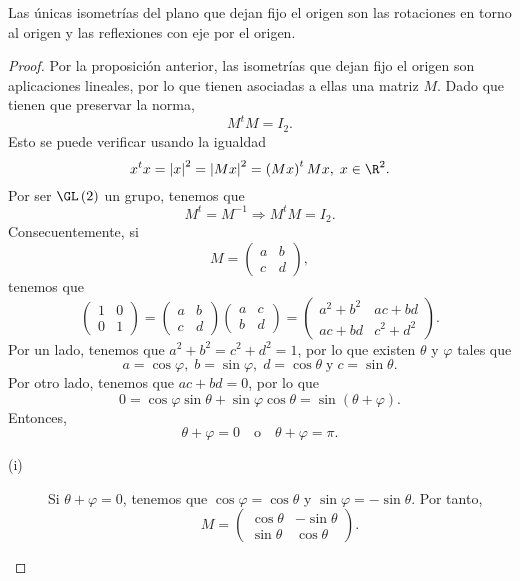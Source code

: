 \begin{fprop}[]
\normalfont Las únicas isometrías del plano que dejan fijo el origen son las rotaciones en torno al origen y las reflexiones con eje por el origen.
\end{fprop}

\begin{proof}
Por la proposición anterior, las isometrías que dejan fijo el origen son aplicaciones lineales, por lo que tienen asociadas a ellas una matriz $\displaystyle M $. Dado que tienen que preservar la norma, 
\[M^{t}M=I_{2} .\]
Esto se puede verificar usando la igualdad
\[x^{t}x = \left|x\right|^{2} = \left|Mx\right|^{2} = \left(Mx\right)^{t}Mx, \; x \in \R^{2} .\]
Por ser $\displaystyle \GL\left(2\right) $ un grupo, tenemos que 
\[M^{t} = M^{-1} \Rightarrow M^{t}M=I_{2} .\]
Consecuentemente, si 
\[M = \begin{pmatrix} a & b \\ c & d \end{pmatrix} ,\]
tenemos que 
\[\begin{pmatrix} 1 & 0 \\ 0 & 1 \end{pmatrix} = \begin{pmatrix} a & b \\ c & d \end{pmatrix}\begin{pmatrix} a & c \\ b & d \end{pmatrix} = \begin{pmatrix} a^{2}+b^{2} & ac+bd \\ ac + bd & c^{2}+d^{2} \end{pmatrix} .\]
Por un lado, tenemos que $\displaystyle a^{2}+b^{2} = c^{2}+d^{2} = 1 $, por lo que existen $\displaystyle \theta $ y $\displaystyle \varphi $ tales que 
\[a = \cos\varphi, \; b=\sin\varphi, \; d=\cos\theta \; \text{y} \; c = \sin \theta .\]
Por otro lado, tenemos que $\displaystyle ac+bd=0 $, por lo que
\[0 = \cos\varphi\sin\theta + \sin\varphi \cos\theta = \sin\left(\theta+\varphi\right) .\]
Entonces,
\[\theta+\varphi = 0 \quad \text{o} \quad \theta+\varphi = \pi  .\]
\begin{description}
\item[(i)] Si $\displaystyle \theta + \varphi = 0 $, tenemos que $\displaystyle \cos\varphi = \cos\theta  $ y $\displaystyle \sin\varphi = -\sin\theta  $. Por tanto, 
	\[M = \begin{pmatrix} \cos\theta & -\sin\theta \\ \sin\theta & \cos\theta \end{pmatrix} .\]

\end{description}
\end{proof}
